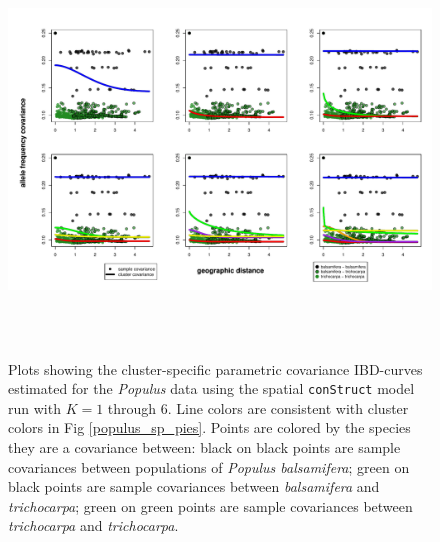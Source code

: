 \documentclass[12pt]{article}
\newcommand{\tri}{\textit{trichocarpa}}
\newcommand{\bals}{\textit{balsamifera}}
\begin{document}
\begin{figure}
	\centering
		{\includegraphics[width=6in,height=4in]{figs/populus/populus_sp_clst_covs.pdf}}
	\caption{
	Plots showing the cluster-specific parametric covariance IBD-curves 
	estimated for the \textit{Populus} data using 
	the spatial \texttt{conStruct} model run with $K=1$ through 6.
	Line colors are consistent with cluster colors in Fig \ref{populus_sp_pies}.
	Points are colored by the species they are a covariance between:
	black on black points are sample covariances between populations of \textit{Populus balsamifera};
	green on black points are sample covariances between \bals{} and \tri{};
	green on green points are sample covariances between \tri{} and \tri{}.
    }\label{populus_sp_clst_covs}
\end{figure}
\end{document}
